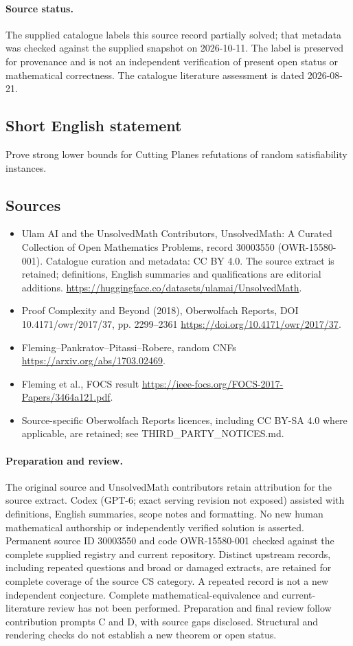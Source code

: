 \documentclass[11pt]{article}
\begin{document}
\paragraph{Source status.}
The supplied catalogue labels this source record partially solved; that metadata was checked against the supplied snapshot on 2026-10-11. The label is preserved for provenance and is not an independent verification of present open status or mathematical correctness. The catalogue literature assessment is dated 2026-08-21.
\subsection{Short English statement}
Prove strong lower bounds for Cutting Planes refutations of random satisfiability instances.
\subsection{Sources}
\begin{itemize}
\item[S1] Ulam AI and the UnsolvedMath Contributors, UnsolvedMath: A Curated Collection of Open Mathematics Problems, record 30003550 (OWR-15580-001). Catalogue curation and metadata: CC BY 4.0. The source extract is retained; definitions, English summaries and qualifications are editorial additions.
\url{https://huggingface.co/datasets/ulamai/UnsolvedMath}.
\item[S2] Proof Complexity and Beyond (2018), Oberwolfach Reports, DOI 10.4171/owr/2017/37, pp. 2299--2361
\url{https://doi.org/10.4171/owr/2017/37}.
\item[S3] Fleming--Pankratov--Pitassi--Robere, random CNFs
\url{https://arxiv.org/abs/1703.02469}.
\item[S4] Fleming et al., FOCS result
\url{https://ieee-focs.org/FOCS-2017-Papers/3464a121.pdf}.
\item Source-specific Oberwolfach Reports licences, including CC BY-SA 4.0 where applicable, are retained; see THIRD\_PARTY\_NOTICES.md.
\end{itemize}
\paragraph{Preparation and review.}
The original source and UnsolvedMath contributors retain attribution for the source extract. Codex (GPT-6; exact serving revision not exposed) assisted with definitions, English summaries, scope notes and formatting. No new human mathematical authorship or independently verified solution is asserted. Permanent source ID 30003550 and code OWR-15580-001 checked against the complete supplied registry and current repository. Distinct upstream records, including repeated questions and broad or damaged extracts, are retained for complete coverage of the source CS category. A repeated record is not a new independent conjecture. Complete mathematical-equivalence and current-literature review has not been performed. Preparation and final review follow contribution prompts C and D, with source gaps disclosed. Structural and rendering checks do not establish a new theorem or open status.
\label{end:30003550}
\end{document}
